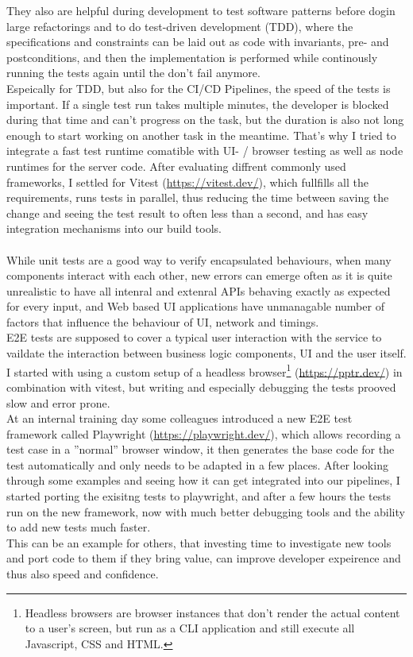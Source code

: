 They also are helpful during development to test software patterns before dogin large refactorings and to do test-driven development (TDD), where the specifications and constraints can be laid out as code
with invariants, pre- and postconditions, and then the implementation is performed while continously running the tests again until the don't fail anymore.
\\
Espeically for TDD, but also for the CI/CD Pipelines, the speed of the tests is important. If a single test run takes multiple minutes, the developer is blocked during that time and can't progress on the task,
but the duration is also not long enough to start working on another task in the meantime.
That's why I tried to integrate a fast test runtime comatible with UI- / browser testing as well as node runtimes for the server code.
After evaluating diffrent commonly used frameworks, I settled for Vitest (\url{https://vitest.dev/}), which fullfills all the requirements, runs tests in parallel, thus reducing the
time between saving the change and seeing the test result to often less than a second, and has easy integration mechanisms into our build tools.
\\\\
While unit tests are a good way to verify encapsulated behaviours, when many components interact with each other, new errors can emerge often as it is
quite unrealistic to have all intenral and extenral APIs behaving exactly as expected for every input, and Web based UI applications have unmanagable number of factors that
influence the behaviour of UI, network and timings.
\\
E2E tests are supposed to cover a typical user interaction with the service to vaildate the interaction between business logic components, UI and the user itself.
I started with using a custom setup of a headless browser\footnote{Headless browsers are browser instances that don't render the actual content to a user's screen, but run as a CLI application and still execute all Javascript, CSS and HTML.} (\url{https://pptr.dev/}) in combination with vitest,
but writing and especially debugging the tests prooved slow and error prone.
\\
At an internal training day some colleagues introduced a new E2E test framework called Playwright (\url{https://playwright.dev/}), which allows recording a test case in a ''normal'' browser window, it then generates the base code for the test automatically and only needs to be adapted in a few places.
After looking through some examples and seeing how it can get integrated into our pipelines, I started porting the exisitng tests to playwright, and after a few hours the tests run on the new framework, now with much better debugging tools and the ability to add new tests much faster.
\\
This can be an example for others, that investing time to investigate new tools and port code to them if they bring value, can improve developer expeirence and thus also speed and confidence.

